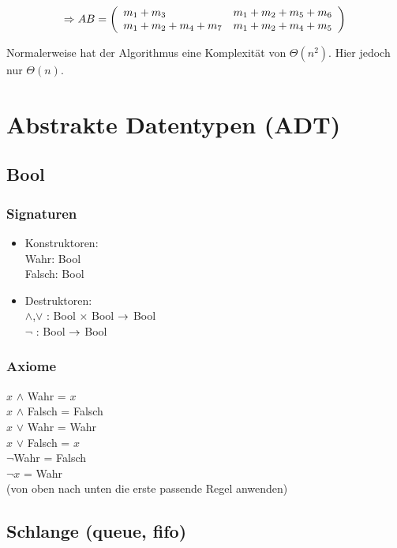 \documentclass[a4paper]{scrartcl}
\begin{document}
$$\Rightarrow AB = 
\left(\begin{array}{ll}
 m_1 + m_3 & m_1 + m_2 + m_5 + m_6 \\
 m_1 + m_2 + m_4 + m_7 & m_1 + m_2 + m_4 + m_5 \\
\end{array}\right)$$

Normalerweise hat der Algorithmus eine Komplexität von $\Theta(n^2)$. Hier jedoch nur $\Theta(n)$.


\section{Abstrakte Datentypen (ADT)}

\subsection{Bool}

\subsubsection*{Signaturen}
\begin{itemize}
	\item Konstruktoren:\\
Wahr: Bool 	\\
Falsch: Bool\\
	\item Destruktoren:\\
$\wedge$,$\vee$ : Bool $\times$ Bool $\rightarrow$ Bool\\
$\neg$ : Bool $\rightarrow$ Bool\\
\end{itemize}

\subsubsection*{Axiome}

$x$ $\wedge$ Wahr 	= $x$\\
$x$ $\wedge$ Falsch = Falsch\\
$x$ $\vee$ Wahr 	= Wahr\\
$x$ $\vee$ Falsch	= $x$\\
$\neg$Wahr = Falsch\\
$\neg x$ = Wahr\\
(von oben nach unten die erste passende Regel anwenden)
\subsection{Schlange (queue, fifo)}
\end{document}
